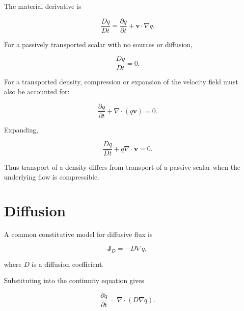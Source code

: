 \documentclass[12pt,oneside]{book}
\begin{document}
The material derivative is

\begin{equation}
    \frac{Dq}{Dt}
    =
    \frac{\partial q}{\partial t}
    +
    \mathbf{v}\cdot\nabla q.
    \label{eq:material-derivative}
\end{equation}

For a passively transported scalar with no sources or diffusion,

\begin{equation}
    \frac{Dq}{Dt}
    =
    0.
    \label{eq:passive-advection}
\end{equation}

For a transported density, compression or expansion of the
velocity field must also be accounted for:

\begin{equation}
    \frac{\partial q}{\partial t}
    +
    \nabla\cdot
    \left(
        q\mathbf{v}
    \right)
    =
    0.
    \label{eq:advective-density-transport}
\end{equation}

Expanding,

\begin{equation}
    \frac{Dq}{Dt}
    +
    q\nabla\cdot\mathbf{v}
    =
    0.
    \label{eq:advective-density-expanded}
\end{equation}

Thus transport of a density differs from transport of a passive
scalar when the underlying flow is compressible.


\section{Diffusion}
\label{sec:diffusion}

A common constitutive model for diffusive flux is

\begin{equation}
    \mathbf{J}_{D}
    =
    -D\nabla q,
    \label{eq:fick-flux}
\end{equation}

where \(D\) is a diffusion coefficient.

Substituting into the continuity equation gives

\begin{equation}
    \frac{\partial q}{\partial t}
    =
    \nabla\cdot
    \left(
        D\nabla q
    \right).
    \label{eq:general-diffusion-equation}
\end{equation}
\end{document}
